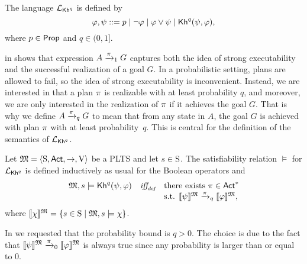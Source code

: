 \begin{definition}\label{def:syntax:PKh}
  The language $\PKh$ is defined by
  \[
  \varphi, \psi ::=
  p \mid \neg \varphi \mid \varphi \vee \psi \mid \kh^q(\psi,\varphi),
  \]
  where $p\in\Prop$ and $q\in(0,1]$.
\end{definition}


 in  shows that
expression $A\reach{\plan}_1 G$ captures both the idea of strong
executability and the successful realization of a goal $G$.  In a
probabilistic setting, plans are allowed to fail, so the idea of
strong executability is inconvenient.  Instead, we are interested in that
a plan $\plan$ is realizable with at least probability $q$, and
moreover, we are only interested in the realization of $\plan$ if it
achieves the goal $G$.  That is why we define $A\reach{\plan}_q G$ to
mean that from any state in $A$, the goal $G$ is achieved with plan
$\plan$ with at least probability~$q$.  This is central for the
definition of the semantics of $\PKh$.

\begin{definition}\label{def:semantics:PKh}
  Let $\model = \tup{\S,\Act,\ra,\V}$ be a PLTS and let $s\in\S$.  The
  satisfiability relation $\models$ for $\PKh$ is defined inductively 
  as usual for the Boolean operators and
  \[
  \begin{array}{l@{\ \ \ }c@{\ \ \  }l}
    \model, s \models \kh^q(\psi,\varphi) & \iffdef & \text{there exists } \plan \in \Act^*  \\
    & & \text{s.t. } \truthset{\model}{\psi} \reach{\plan}_q \truthset{\model}{\varphi}, 
  \end{array}
  \]
  where $\truthset{\model}{\chi} = \csetsc{s\in\S}{\model,s\models\chi}$.
\end{definition}

In  we requested that the probability bound is
${q>0}$.  The choice is due to the fact that $\truthset{\model}{\psi}
\reach{\plan}_0 \truthset{\model}{\varphi}$ is always true since any
probability is larger than or equal to $0$.

